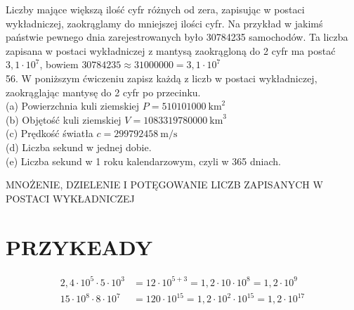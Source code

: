 \documentclass[10pt]{article}
\begin{document}
Liczby mające większą ilość cyfr różnych od zera, zapisując w postaci wykładniczej, zaokrąglamy do mniejszej ilości cyfr. Na przykład w jakimś państwie pewnego dnia zarejestrowanych było 30784235 samochodów. Ta liczba zapisana w postaci wykładniczej z mantysą zaokrągloną do 2 cyfr ma postać \(3,1 \cdot 10^{7}\), bowiem \(30784235 \approx 31000000=3,1 \cdot 10^{7}\)\\
56. W poniższym ćwiczeniu zapisz każdą z liczb w postaci wykładniczej, zaokrąglając mantysę do 2 cyfr po przecinku.\\
(a) Powierzchnia kuli ziemskiej \(P=510101000 \mathrm{~km}^{2}\)\\
(b) Objętość kuli ziemskiej \(V=1083319780000 \mathrm{~km}^{3}\)\\
(c) Prędkość światła \(c=299792458 \mathrm{~m} / \mathrm{s}\)\\
(d) Liczba sekund w jednej dobie.\\
(e) Liczba sekund w 1 roku kalendarzowym, czyli w 365 dniach.

MNOŻENIE, DZIELENIE I POTĘGOWANIE LICZB ZAPISANYCH W POSTACI WYKŁADNICZEJ

\section*{PRZYKEADY}
\[
\begin{aligned}
2,4 \cdot 10^{5} \cdot 5 \cdot 10^{3} & =12 \cdot 10^{5+3}=1,2 \cdot 10 \cdot 10^{8}=1,2 \cdot 10^{9} \\
15 \cdot 10^{8} \cdot 8 \cdot 10^{7} & =120 \cdot 10^{15}=1,2 \cdot 10^{2} \cdot 10^{15}=1,2 \cdot 10^{17}
\end{aligned}
\]
\end{document}

